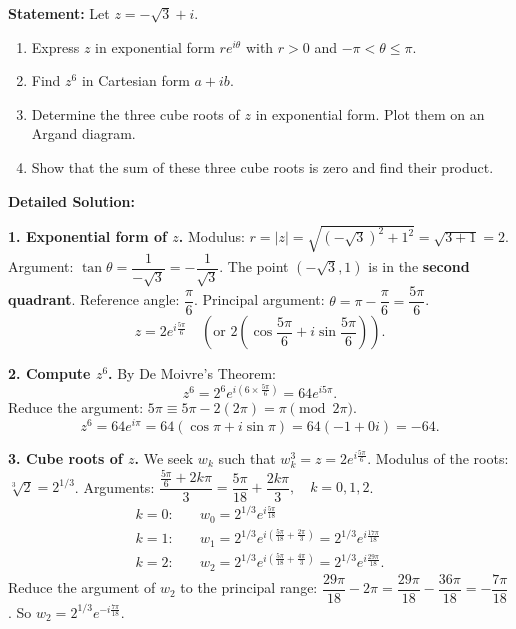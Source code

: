 \documentclass[11pt]{article}
\begin{document}
\begin{exoresolu}
\textbf{Statement:} Let $z = -\sqrt{3} + i$.
\begin{enumerate}
    \item Express $z$ in exponential form $re^{i\theta}$ with $r>0$ and $-\pi < \theta \le \pi$.
    \item Find $z^6$ in Cartesian form $a+ib$.
    \item Determine the three cube roots of $z$ in exponential form. Plot them on an Argand diagram.
    \item Show that the sum of these three cube roots is zero and find their product.
\end{enumerate}

\tcblower
\textbf{Detailed Solution:}

\textbf{1. Exponential form of $z$.}
Modulus: $r = |z| = \sqrt{(-\sqrt{3})^2 + 1^2} = \sqrt{3+1} = 2$.
Argument: $\tan\theta = \dfrac{1}{-\sqrt{3}} = -\dfrac{1}{\sqrt{3}}$. The point $(-\sqrt{3}, 1)$ is in the \textbf{second quadrant}.
Reference angle: $\dfrac{\pi}{6}$. Principal argument: $\theta = \pi - \dfrac{\pi}{6} = \dfrac{5\pi}{6}$.
\[
z = 2e^{i\frac{5\pi}{6}} \quad \left(\text{or } 2\left(\cos\frac{5\pi}{6}+i\sin\frac{5\pi}{6}\right)\right).
\]

\textbf{2. Compute $z^6$.}
By De Moivre's Theorem:
\[
z^6 = 2^6 e^{i\left(6\times\frac{5\pi}{6}\right)} = 64 e^{i5\pi}.
\]
Reduce the argument: $5\pi \equiv 5\pi - 2(2\pi) = \pi \pmod{2\pi}$.
\[
z^6 = 64 e^{i\pi} = 64(\cos\pi + i\sin\pi) = 64(-1 + 0i) = \boxed{-64}.
\]

\textbf{3. Cube roots of $z$.}
We seek $w_k$ such that $w_k^3 = z = 2e^{i\frac{5\pi}{6}}$.
Modulus of the roots: $\sqrt[3]{2} = 2^{1/3}$.
Arguments: $\dfrac{\frac{5\pi}{6} + 2k\pi}{3} = \dfrac{5\pi}{18} + \dfrac{2k\pi}{3},\quad k=0,1,2$.
\begin{align*}
k=0:\quad & w_0 = 2^{1/3} e^{i\frac{5\pi}{18}} \\
k=1:\quad & w_1 = 2^{1/3} e^{i\left(\frac{5\pi}{18}+\frac{2\pi}{3}\right)} = 2^{1/3} e^{i\frac{17\pi}{18}} \\
k=2:\quad & w_2 = 2^{1/3} e^{i\left(\frac{5\pi}{18}+\frac{4\pi}{3}\right)} = 2^{1/3} e^{i\frac{29\pi}{18}}.
\end{align*}
Reduce the argument of $w_2$ to the principal range: $\dfrac{29\pi}{18} - 2\pi = \dfrac{29\pi}{18} - \dfrac{36\pi}{18} = -\dfrac{7\pi}{18}$.
So $w_2 = 2^{1/3} e^{-i\frac{7\pi}{18}}$.


\end{exoresolu}
\end{document}
